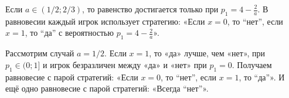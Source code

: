 \begin{enumerate}
Если $ a\in (1/2;2/3) $, то равенство достигается только при $ p_{1}=4-\frac{2}{a} $. В равновесии каждый игрок использует стратегию: «Если $ x=0 $, то “нет”, если $ x=1 $, то “да” с вероятностью $ p_{1}=4-\frac{2}{a}  $».

Рассмотрим случай $ a=1/2 $. Если $ x=1 $, то «да» лучше, чем «нет», при $ p_{1}\in (0;1] $ и игрок безразличен между «да» и «нет» при $ p_{1}=0 $. Получаем равновесие с парой стратегий: «Если $ x=0 $, то “нет”, если $ x=1 $, то “да”». И ещё одно равновесие с парой стратегий: «Всегда “нет”».

\end{enumerate}
